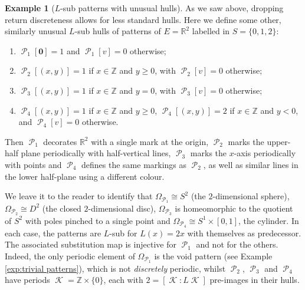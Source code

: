 \documentclass[11pt]{amsart}
\numberwithin{equation}{section}
\theoremstyle{plain}
\theoremstyle{definition}
\newtheorem{example}[theorem]{Example}
\newcommand{\R}{\mathbb R}
\newcommand{\Z}{\mathbb Z}
\DeclareMathOperator{\cP}{\mathcal{P}}
\DeclareMathOperator{\cK}{\mathcal{K}}
\begin{document}
\begin{example}[\(L\)-sub patterns with unusual hulls]
\label{exp:unusual hulls}
As we saw above, dropping return discreteness allows for less standard hulls. Here we define some other, similarly unusual \(L\)-sub hulls of patterns of \(E = \R^2\) labelled in \(S = \{0,1,2\}\):
\begin{enumerate}
	\item \(\cP_1[\mathbf{0}] = 1\) and \(\cP_1[v] = 0\) otherwise;
	\item \(\cP_2[(x,y)] = 1\) if \(x \in \Z\) and \(y \geq 0\), with \(\cP_2[v] = 0\) otherwise;
	\item \(\cP_3[(x,y)] = 1\) if \(x \in \Z\) and \(y = 0\), with \(\cP_3[v] = 0\) otherwise;
	\item \(\cP_4[(x,y)] = 1\) if \(x \in \Z\) and \(y \geq 0\), \(\cP_4[(x,y)] = 2\) if \(x \in \Z\) and \(y < 0\), and \(\cP_4[v] = 0\) otherwise.
\end{enumerate}
Then \(\cP_1\) decorates \(\R^2\) with a single mark at the origin, \(\cP_2\) marks the upper-half plane periodically with half-vertical lines, \(\cP_3\) marks the \(x\)-axis periodically with points and \(\cP_4\) defines the same markings as \(\cP_2\), as well as similar lines in the lower half-plane using a different colour.

We leave it to the reader to identify that \(\Omega_{\cP_1} \cong S^2\) (the \(2\)-dimensional sphere), \(\Omega_{\cP_2} \cong D^2\) (the closed \(2\)-dimensional disc), \(\Omega_{\cP_3}\) is homeomorphic to the quotient of \(S^2\) with poles pinched to a single point and \(\Omega_{\cP_4} \cong S^1 \times [0,1]\), the cylinder. In each case, the patterns are \(L\)-sub for \(L(x) = 2x\) with themselves as predecessor. The associated substitution map is injective for \(\cP_1\) and not for the others. Indeed, the only periodic element of \(\Omega_{\cP_1}\) is the void pattern (see Example \ref{exp:trivial patterns}), which is not \emph{discretely} periodic, whilst \(\cP_2\), \(\cP_3\) and \(\cP_4\) have periods \(\cK = \Z \times \{0\}\), each with \(2 = [\cK : L\cK]\) pre-images in their hulls.
\end{example}
\end{document}
